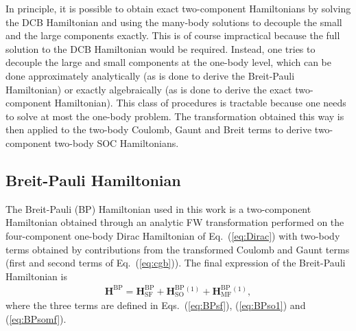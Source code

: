 \documentclass[10pt,aps,prb,twocolumn,amsmath,amssymb,superscriptaddress]{revtex4-1}
\renewcommand\b[1]{\ensuremath{\mathbf{#1}}}
\newcommand\equ[2]{\begin{align}#2\label{#1}\end{align}}
\begin{document}
In principle, it is possible to obtain exact two-component Hamiltonians by solving the DCB Hamiltonian and using the many-body solutions to decouple the small and the large components exactly. This is of course impractical because the full solution to the DCB Hamiltonian would be required. Instead, one tries to decouple the large and small components at the one-body level, which can be done approximately analytically (as is done to derive the Breit-Pauli Hamiltonian) or exactly algebraically (as is done to derive the exact two-component Hamiltonian). This class of procedures is tractable because one needs to solve at most the one-body problem. The transformation obtained this way is then applied to the two-body Coulomb, Gaunt and Breit terms to derive two-component two-body SOC Hamiltonians.
 
\subsection{Breit-Pauli Hamiltonian}
The Breit-Pauli (BP) Hamiltonian used in this work is a two-component Hamiltonian 
obtained
through an analytic FW transformation performed
on the four-component one-body Dirac Hamiltonian of Eq.~(\ref{eq:Dirac})
with two-body terms obtained by contributions from the transformed Coulomb and Gaunt terms (first and second terms of Eq.~(\ref{eq:cgb})).
The final expression of the Breit-Pauli Hamiltonian\cite{dyallbook,reiherbook} is
\equ{ }{
    \b{H}^\text{BP}=\b{H}^\text{BP}_\text{SF}+ \b{H}^\text{BP}_\text{SO}{}^{(1)} + \b{H}^\text{BP}_\text{MF}{}^{(1)}
,}
where the three terms are defined in Eqs.~(\ref{eq:BPsf}), (\ref{eq:BPso1}) and (\ref{eq:BPsomf}).
\end{document}
